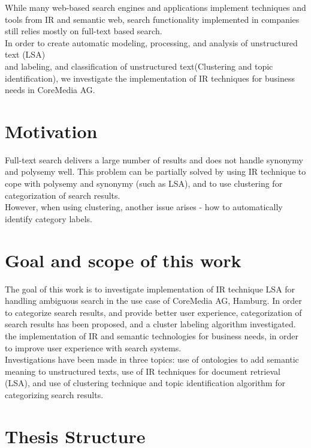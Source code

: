 \begin{center}
While many web-based search engines and applications implement techniques and tools from IR and semantic web, search functionality implemented in companies still relies mostly on full-text based search. \\


In order to create automatic modeling, processing, and analysis of unstructured text (LSA)\\

and labeling, and classification of unstructured text(Clustering and topic identification), we investigate the implementation of IR techniques for business needs in CoreMedia AG.\\

\section{Motivation}
Full-text search delivers a large number of results and does not handle synonymy and polysemy well. This problem can be partially solved by using IR technique to cope with polysemy and synonymy (such as LSA), and to use clustering for categorization of search results.\\
However, when using clustering, another issue arises - how to automatically identify category labels.\\

\section{Goal and scope of this work}
The goal of this work is to investigate implementation of IR technique LSA for handling ambiguous search in the use case of CoreMedia AG, Hamburg. In order to categorize search results, and provide better user experience, categorization of search results has been proposed, and a cluster labeling algorithm investigated. the implementation of IR and semantic technologies for business needs, in order to improve user experience with search systems.\\
Investigations have been made in three topics: use of ontologies to add semantic meaning to unstructured texts, use of IR techniques for document retrieval (LSA), and use of clustering technique and topic identification algorithm for categorizing search results.\\

\section{Thesis Structure}


\end{center}

